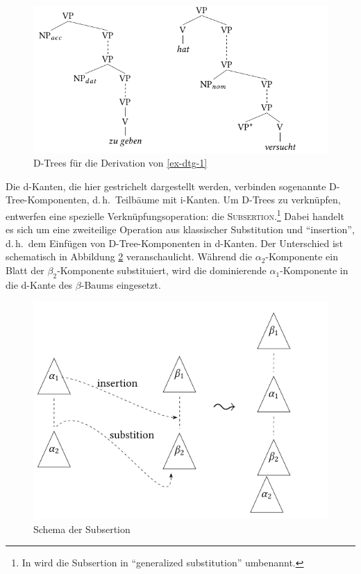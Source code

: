 \begin{figure}[t]
\centering
\includegraphics{graphics/abb68.pdf}
\caption{\label{fig-dtg-1}D-Trees für die Derivation von \ref{ex-dtg-1}}
\end{figure}
Die d-Kanten, die hier gestrichelt dargestellt werden, verbinden sogenannte D-Tree-Kompo\-nenten, d.\,h.\ Teilbäume mit i-Kanten. Um D-Trees zu verknüpfen, entwerfen \cite{Rambow:etal:95} eine spezielle Verknüpfungsoperation: die \textsc{Subsertion}.\footnote{In \cite{Rambow:etal:01} wird die Subsertion in "`generalized substitution"' umbenannt.} Dabei handelt es sich um eine zweiteilige Operation aus klassischer Substitution und "`insertion"', d.\,h.\ dem Einfügen von D-Tree-Komponenten in d-Kanten. Der Unterschied ist schematisch in Abbildung \ref{fig-dtg-3} veranschaulicht. Während die $\alpha_2$-Komponente ein Blatt der $\beta_2$-Komponente substituiert, wird die dominierende $\alpha_1$-Komponente in die d-Kante des $\beta$-Baums eingesetzt. 
\begin{figure}
\centering
\includegraphics{graphics/abb69.pdf}
\caption{\label{fig-dtg-3}Schema der Subsertion}
\end{figure}
